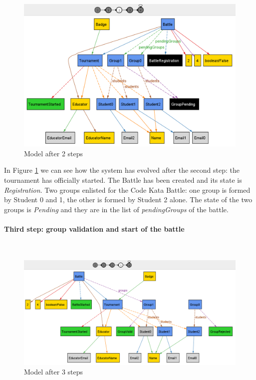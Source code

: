 \begin{figure}[h]
    \centering
    \includegraphics[scale=0.65]{Images/AlloyStep2.png}
    \caption{Model after 2 steps}
    \label{fig:step2}
\end{figure}

In Figure \ref{fig:step2} we can see how the system has evolved after the second step: the tournament has officially started. The Battle has been created and its state is \textit{Registration}. Two groups enlisted for the Code Kata Battle: one group is formed by Student 0 and 1, the other is formed by Student 2 alone. The state of the two groups is \textit{Pending} and they are in the list of \textit{pendingGroups} of the battle.

\newpage

\paragraph{Third step: group validation and start of the battle}
\textbf{ }\\

\begin{figure}[h]
    \centering
    \includegraphics[scale=0.53]{Images/AlloyStep3.png}
    \caption{Model after 3 steps}
    \label{fig:step3}
\end{figure}

